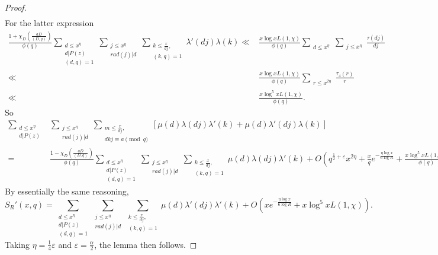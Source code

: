 \documentclass{amsart}
\begin{document}
\begin{proof}
\begin{align*}
\end{align*}
For the latter expression
\begin{align*}
\frac{1+\chi_D\left(\frac{aD}{(D,q)}\right)}{\phi(q)}\sum_{\substack{d\leq x^\eta \\ d|P(z)\\ (d,q)=1}}\sum_{\substack{j\leq x^\eta \\ rad(j)|d}}\mathop{\sum}\limits_{\substack{k\leq \frac{x}{dj},\\ (k,q)=1 }}\lambda'(dj)\lambda(k)\ll &\frac{x\log xL(1,\chi)}{\phi(q)}\sum_{\substack{d\leq x^\eta}}\sum_{\substack{j\leq x^\eta}}\frac{\tau(dj)}{dj}\\
\ll &\frac{x\log xL(1,\chi)}{\phi(q)}\sum_{\substack{r\leq x^{2\eta}}}\frac{\tau_4(r)}{r}\\
\ll &\frac{x\log^5 xL(1,\chi)}{\phi(q)}.
\end{align*}
So
\begin{align*}
\sum_{\substack{d\leq x^\eta \\ d|P(z)}}&\sum_{\substack{j\leq x^\eta \\ rad(j)|d}}\mathop{\sum}\limits_{\substack{m\leq \frac{x}{dj},\\ dkj\equiv a\pmod q }}\left[\mu(d)\lambda(dj)\lambda'(k)+\mu(d)\lambda'(dj)\lambda(k)\right]\\
=&\frac{1-\chi_D\left(\frac{aD}{(D,q)}\right)}{\phi(q)}\sum_{\substack{d\leq x^\eta \\ d|P(z)\\ (d,q)=1}}\sum_{\substack{j\leq x^\eta \\ rad(j)|d}}\mathop{\sum}\limits_{\substack{k\leq \frac{x}{dj},\\ (k,q)=1 }}\mu(d)\lambda(dj)\lambda'(k)+O\left(q^{\frac 12+\varepsilon}x^{2\eta}+\frac xqe^{-\frac{\eta\log x}{6\log R}}+\frac{x\log^5 xL(1,\chi)}{\phi(q)}\right).
\end{align*}
By essentially the same reasoning,
$$S_R'(x,q)=\sum_{\substack{d\leq x^\eta \\ d|P(z)\\ (d,q)=1}}\sum_{\substack{j\leq x^\eta \\ rad(j)|d}}\mathop{\sum}\limits_{\substack{k\leq \frac{x}{dj},\\ (k,q)=1 }}\mu(d)\lambda'(dj)\lambda'(k)+O\left(xe^{-\frac{\eta\log x}{6\log R}}+x\log^5 xL(1,\chi)\right).$$
Taking $\eta=\frac 14\varepsilon$ and $\varepsilon=\frac{\alpha}{2}$, the lemma then follows.
\end{proof}
\end{document}
